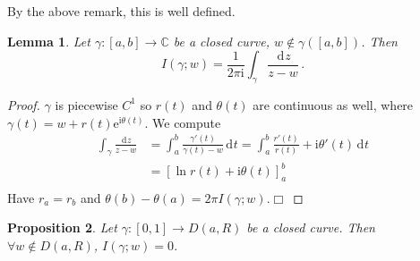 \documentclass{article}
\theoremstyle{plain}\theoremheaderfont{\normalfont\itshape}\theorembodyfont{\rmfamily}\theoremseparator{.}\newtheorem*{rem}{Remark}\newtheorem*{ex}{Example}\newtheorem*{proof}{Proof}\newtheorem*{altp}{Alternative proof}\newtheorem*{con}{Consequences}\newtheorem*{notn}{Notations}\newtheorem*{cau}{Caution}\newtheorem*{term}{Terminology}\newtheorem*{keyex}{Key example}
\theoremstyle{plain}\theoremheaderfont{\normalfont\bfseries}\theorembodyfont{\rmfamily}\theoremseparator{.}\newtheorem{thm}{Theorem}[section]\newtheorem{lem}[thm]{Lemma}\newtheorem{prop}[thm]{Proposition}\newtheorem*{cor}{Corollary}\newtheorem{defn}[thm]{Definition}\newtheorem{clm}[thm]{Claim}\newtheorem{clminproof}{Claim}\newtheorem{leminproof}{Lemma}\newtheorem{app}{Application}
\theoremstyle{break}\theoremheaderfont{\normalfont\itshape}\theorembodyfont{\rmfamily}\theoremseparator{.\medskip}\newtheorem*{proofskip}{Proof}\newtheorem*{exs}{Examples}\newtheorem*{rems}{Remarks}\newtheorem*{rec}{Recall}\newtheorem*{ppts}{Properties}
\theoremstyle{break}\theoremheaderfont{\normalfont\bfseries}\theorembodyfont{\rmfamily}\theoremseparator{.\medskip}\newtheorem{lemskip}[thm]{Lemma}\newtheorem{defnskip}[thm]{Definition}\newtheorem{propskip}[thm]{Proposition}\newtheorem{thmskip}[thm]{Theorem}
\numberwithin{equation}{section}
\newcommand{\ii}{\mathrm{i}}
\newcommand{\ee}{\mathrm{e}}
\newcommand{\qed}{\hfill\ensuremath{\Box}}
\newcommand{\dd}[2][]{\,\mathrm{d}^{#1} #2}
\newcommand{\CC}{\mathbb{C}}
\begin{document}
    By the above remark, this is well defined.
    \begin{lem}
        Let \(\gamma:[a,b]\to\CC\) be a closed curve, \(w\notin\gamma([a,b])\). Then
        \[I(\gamma;w)=\frac{1}{2\pi \ii}\int_\gamma\frac{\dd{z}}{z-w}\,.\]
    \end{lem}
    \begin{proof}
        \(\gamma\) is piecewise \(C^1\) so \(r(t)\) and \(\theta(t)\) are continuous as well, where \(\gamma(t)=w+r(t)\ee^{\ii \theta(t)}\). We compute
        \begin{align*}
            \int_\gamma\frac{\dd{z}}{z-w}&=\int_{a}^{b}\frac{\gamma'(t)}{\gamma(t)-w}\dd{t}=\int_{a}^{b}\frac{r'(t)}{r(t)}+\ii\theta'(t)\dd{t}\\
            &=[\ln r(t)+\ii\theta(t)]_a^b\\
        \end{align*}
        Have \(r_a=r_b\) and \(\theta(b)-\theta(a)=2\pi I(\gamma;w)\).\qed
    \end{proof}
    \begin{prop}
        Let \(\gamma:[0,1]\to D(a,R)\) be a closed curve. Then \(\forall w\notin D(a,R)\), \(I(\gamma;w)=0\).
    \end{prop}
\end{document}
